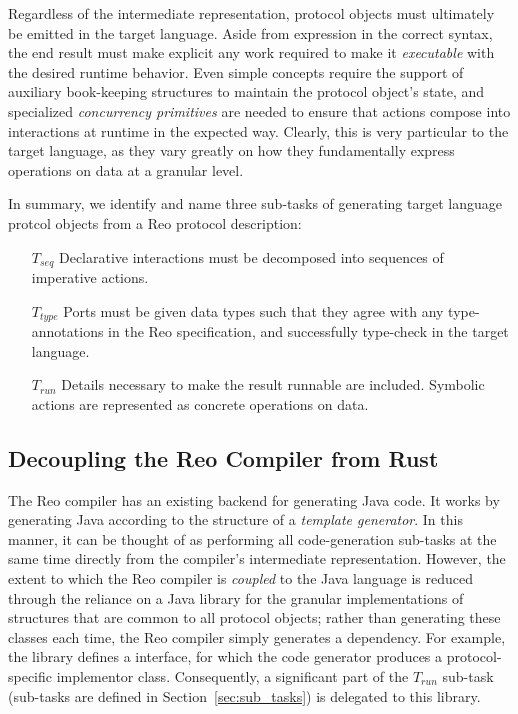 Regardless of the intermediate representation, protocol objects must ultimately be emitted in the target language. Aside from expression in the correct syntax, the end result must make explicit any work required to make it \textit{executable} with the desired runtime behavior. Even simple concepts require the support of auxiliary book-keeping structures to maintain the protocol object's state, and specialized \textit{concurrency primitives} are needed to ensure that actions compose into interactions at runtime in the expected way. Clearly, this is very particular to the target language, as they vary greatly on how they fundamentally express operations on data at a granular level.

In summary, we identify and name three sub-tasks of generating target language protcol objects from a Reo protocol description:
\begin{itemize}
	\item [$T_{seq}$] Declarative interactions must be decomposed into sequences of imperative actions.
	\item [$T_{type}$] Ports must be given data types such that they agree with any type-annotations in the Reo specification, and successfully type-check in the target language.
	\item [$T_{run}$] Details necessary to make the result runnable are included. Symbolic actions are represented as concrete operations on data.
\end{itemize}


\subsection{Decoupling the Reo Compiler from Rust}
\label{sec:decoupling_reo_rust}
The Reo compiler has an existing backend for generating Java code. It works by generating Java according to the structure of a \textit{template generator}. In this manner, it can be thought of as performing all code-generation sub-tasks at the same time directly from the compiler's intermediate representation. However, the extent to which the Reo compiler is \textit{coupled} to the Java language is reduced through the reliance on a Java library for the granular implementations of structures that are common to all protocol objects; rather than generating these classes each time, the Reo compiler simply generates a dependency. For example, the library defines a  interface, for which the code generator produces a protocol-specific implementor class. Consequently, a significant part of the $T_{run}$ sub-task (sub-tasks are defined in Section~\ref{sec:sub_tasks}) is delegated to this library.

